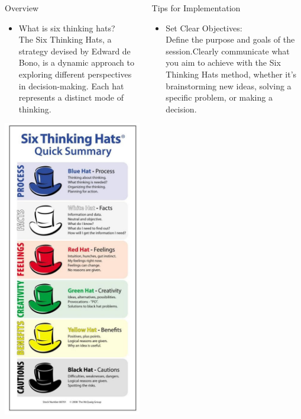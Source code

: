 \documentclass{beamer}
\begin{document}
\begin{frame}[fragile]
\begin{columns}[T]
\begin{column}{.33\textwidth}
\begin{block}{Overview}
\begin{itemize}
\item \textcolor{mycolor}{What is six thinking hats?}\\
The Six Thinking Hats, a strategy devised by Edward de Bono, is a dynamic approach to exploring different perspectives in decision-making. Each hat represents a distinct mode of thinking. 
\end{itemize}
\begin{center}
\includegraphics[width=.6\linewidth]{What.jpg}
\end{center}
\end{block}
\end{column}


\begin{column}{.3\textwidth}


\begin{block}{Tips for Implementation}
\begin{itemize}
\item \textcolor{mycolor}{Set Clear Objectives:} \\
\hspace*{1em}Define the purpose and goals of the session.Clearly communicate what you aim to achieve with the Six Thinking Hats method, whether it's brainstorming new ideas, solving a specific problem, or making a decision.


\end{itemize}
\end{block}
\end{column}
\end{columns}
\end{frame}
\end{document}
